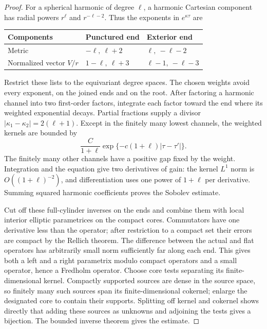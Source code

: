 \begin{proof}
For a spherical harmonic of degree $\ell$, a harmonic Cartesian
component has radial powers $r^\ell$ and $r^{-\ell-2}$.
Thus the exponents in $e^{\kappa\tau}$ are
\begin{center}
\begin{tabular}{lll}
\toprule
Components & Punctured end & Exterior end\\
\midrule
Metric & $-\ell,\ \ell+2$ & $\ell,\ -\ell-2$\\
Normalized vector $V/r$ & $1-\ell,\ \ell+3$ & $\ell-1,\ -\ell-3$\\
\bottomrule
\end{tabular}
\end{center}
Restrict these lists to the equivariant degree spaces.  The chosen
weights avoid every exponent, on the joined ends and on the root.
After factoring a harmonic channel into two first-order factors,
integrate each factor toward the end where its weighted exponential
decays.  Partial fractions supply a divisor
$|\kappa_1-\kappa_2|=2(\ell+1)$.  Except in the finitely many lowest
channels, the weighted kernels are bounded by
\begin{equation}
 \frac{C}{1+\ell}\exp\{-c(1+\ell)|\tau-\tau'|\}.
 \label{ell:kernel-bound}
\end{equation}
The finitely many other channels have a positive gap fixed by the
weight.  Integration and the equation give two derivatives of gain:
the kernel $L^1$ norm is $O((1+\ell)^{-2})$, and differentiation
uses one power of $1+\ell$ per derivative.  Summing squared
harmonic coefficients proves the Sobolev estimate.

Cut off these full-cylinder inverses on the ends and combine them
with local interior elliptic parametrices on the compact cores.
Commutators have one derivative less than the operator; after
restriction to a compact set their errors are compact by the
Rellich theorem.  The difference between the actual and flat
operators has arbitrarily small norm sufficiently far along each
end.  This gives both a left and a right parametrix modulo compact
operators and a small operator, hence a Fredholm operator.
Choose core tests separating its finite-dimensional kernel.
Compactly supported sources are dense in the source space, so
finitely many such sources span its finite-dimensional cokernel;
enlarge the designated core to contain their supports.  Splitting
off kernel and cokernel shows directly that adding these sources
as unknowns and adjoining the tests gives a bijection.  The bounded
inverse theorem gives the estimate.


\end{proof}
